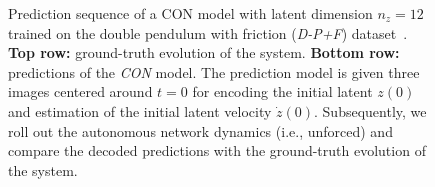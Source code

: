 \begin{figure}[hb]
    \caption{Prediction sequence of a \gls{CON} model with latent dimension $n_z=12$ trained on the double pendulum with friction (\emph{D-P+F}) dataset~\citep{botev2021priors}. 
    \textbf{Top row:} ground-truth evolution of the system. \textbf{Bottom row:} predictions of the \emph{CON} model. \newline
    The prediction model is given three images centered around $t=0$ for encoding the initial latent $z(0)$ and estimation of the initial latent velocity $\dot{z}(0)$. Subsequently, we roll out the autonomous network dynamics (i.e., unforced) and compare the decoded predictions with the ground-truth evolution of the system.  
    }\label{fig:con:latent_dynamics:sequence_of_stills:d-p+f:rollout7}
\end{figure}

